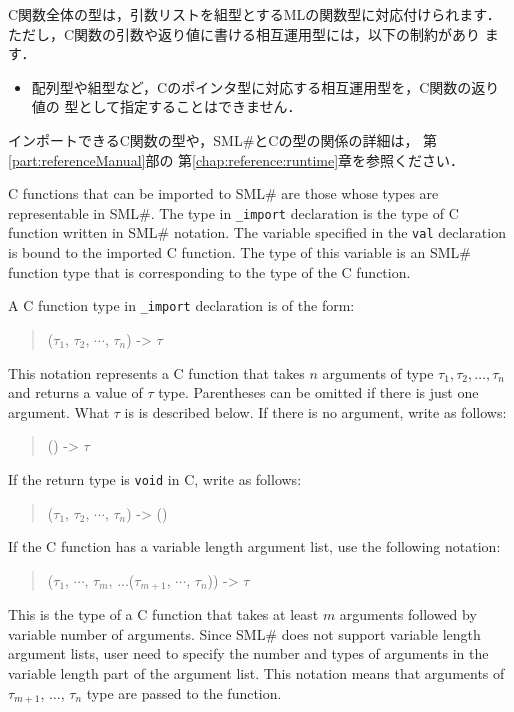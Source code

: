 \documentclass{jbook}
\newcommand{\smlsharp}{SML\#}
\newenvironment{program}{\begin{quote}\begin{tt}}%
                        {\end{tt}\end{quote}}
\begin{document}
	C関数全体の型は，引数リストを組型とするMLの関数型に対応付けられます．
	ただし，C関数の引数や返り値に書ける相互運用型には，以下の制約があり
ます．
\begin{itemize}
\item 配列型や組型など，Cのポインタ型に対応する相互運用型を，C関数の返り値の
型として指定することはできません．
\end{itemize}

	インポートできるC関数の型や，\smlsharp{}とCの型の関係の詳細は，
第\ref{part:referenceManual}部の
第\ref{chap:reference:runtime}章を参照ください．


\else%

	C functions that can be imported to \smlsharp{} are those whose
types are representable in \smlsharp{}.
	The type in {\tt \_import} declaration is the type of C function
written in \smlsharp{} notation.
	The variable specified in the {\tt val} declaration is bound
to the imported C function.
	The type of this variable is an \smlsharp{} function type
that is corresponding to the type of the C function.

	A C function type in {\tt \_import} declaration is of the form:
\begin{program}
($\tau_1$, $\tau_2$, $\cdots$, $\tau_n$) -> $\tau$
\end{program}
	This notation represents a C function that takes $n$ arguments
of type $\tau_1, \tau_2, \ldots, \tau_n$ and returns a value of $\tau$ type.
	Parentheses can be omitted if there is just one argument.
	What $\tau$ is is described below.
        If there is no argument, write as follows:
\begin{program}
() -> $\tau$
\end{program}
	If the return type is {\tt void} in C, write as follows:
\begin{program}
($\tau_1$, $\tau_2$, $\cdots$, $\tau_n$) -> ()
\end{program}
	If the C function has a variable length argument list, use the
following notation:
\begin{program}
($\tau_1$, $\cdots$, $\tau_m$, ...($\tau_{m+1}$, $\cdots$, $\tau_{n}$)) -> $\tau$
\end{program}
	This is the type of a C function that takes at least $m$ arguments
followed by variable number of arguments.
	Since \smlsharp{} does not support variable length argument lists,
user need to specify the number and types of arguments in the variable
length part of the argument list.
	This notation means that arguments of $\tau_{m+1}$, $\ldots$, $\tau_{n}$
type are passed to the function.
\end{document}
